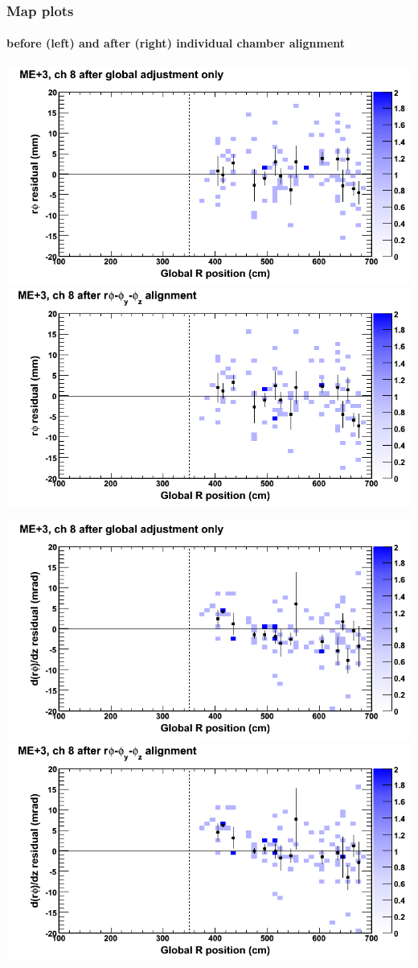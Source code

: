 \documentclass[compress]{beamer}
\begin{document}
\begin{frame}
\frametitle{Map plots}
\framesubtitle{before (left) and after (right) individual chamber alignment}
\includegraphics[width=0.5\linewidth]{ringmapplots_3dof/before_CSCvsr_mep3ch08_x.png} \includegraphics[width=0.5\linewidth]{ringmapplots_3dof/after_CSCvsr_mep3ch08_x.png}

\includegraphics[width=0.5\linewidth]{ringmapplots_3dof/before_CSCvsr_mep3ch08_dxdz.png} \includegraphics[width=0.5\linewidth]{ringmapplots_3dof/after_CSCvsr_mep3ch08_dxdz.png}
\end{frame}
\end{document}
